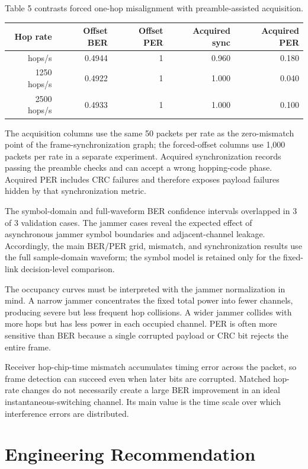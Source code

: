 \documentclass[
]{article}
\newcounter{none} %
\begin{document}
Table 5 contrasts forced one-hop misalignment with preamble-assisted
acquisition.

{\def\LTcaptype{none} %
\begin{longtable}[]{@{}rrrrr@{}}
\toprule\noalign{}
Hop rate & Offset BER & Offset PER & Acquired sync & Acquired PER \\
\midrule\noalign{}
\endhead
\bottomrule\noalign{}
\endlastfoot
625 hops/s & 0.4944 & 1 & 0.960 & 0.180 \\
1250 hops/s & 0.4922 & 1 & 1.000 & 0.040 \\
2500 hops/s & 0.4933 & 1 & 1.000 & 0.100 \\
\end{longtable}
}

The acquisition columns use the same 50 packets per rate as the
zero-mismatch point of the frame-synchronization graph; the
forced-offset columns use 1,000 packets per rate in a separate
experiment. Acquired synchronization records passing the preamble checks
and can accept a wrong hopping-code phase. Acquired PER includes CRC
failures and therefore exposes payload failures hidden by that
synchronization metric.

The symbol-domain and full-waveform BER confidence intervals overlapped
in 3 of 3 validation cases. The jammer cases reveal the expected effect
of asynchronous jammer symbol boundaries and adjacent-channel leakage.
Accordingly, the main BER/PER grid, mismatch, and synchronization
results use the full sample-domain waveform; the symbol model is
retained only for the fixed-link decision-level comparison.

The occupancy curves must be interpreted with the jammer normalization
in mind. A narrow jammer concentrates the fixed total power into fewer
channels, producing severe but less frequent hop collisions. A wider
jammer collides with more hops but has less power in each occupied
channel. PER is often more sensitive than BER because a single corrupted
payload or CRC bit rejects the entire frame.

Receiver hop-chip-time mismatch accumulates timing error across the
packet, so frame detection can succeed even when later bits are
corrupted. Matched hop-rate changes do not necessarily create a large
BER improvement in an ideal instantaneous-switching channel. Its main
value is the time scale over which interference errors are distributed.

\section{Engineering Recommendation}\label{engineering-recommendation}
\end{document}
